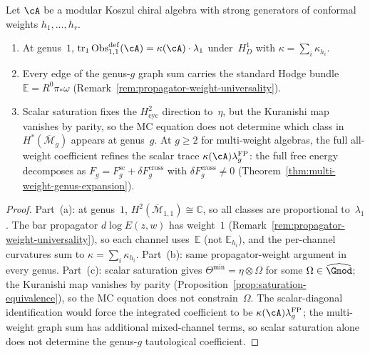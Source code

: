 \begin{proposition}
\label{prop:multi-generator-obstruction}
Let $\cA$ be a modular Koszul chiral algebra with strong generators
of conformal weights $h_1, \ldots, h_r$.
\begin{enumerate}[label=\textup{(\alph*)}]
\item At genus~$1$,
$\operatorname{tr}_1\operatorname{Obs}^{\mathrm{def}}_{1,1}(\cA) = \kappa(\cA) \cdot \lambda_1$
under~$H_D^1$
with $\kappa = \sum_i \kappa_{h_i}$.
\item Every edge of the genus-$g$ graph sum carries the standard
Hodge bundle $\mathbb{E} = R^0\pi_*\omega$
\textup{(}Remark~\textup{\ref{rem:propagator-weight-universality}}\textup{)}.
\item Scalar saturation fixes the $H^2_{\mathrm{cyc}}$ direction
to~$\eta$, but the Kuranishi map vanishes by parity, so the
MC equation does not determine which class in
$H^*(\overline{\mathcal{M}}_g)$ appears at genus~$g$.
 At $g \geq 2$ for multi-weight algebras, the full all-weight
 coefficient refines the scalar trace
 \(\kappa(\cA)\lambda_g^{\mathrm{FP}}\): the full free energy
 decomposes as \(F_g=F_g^{\mathrm{sc}}+\delta F_g^{\mathrm{cross}}\)
 with $\delta F_g^{\mathrm{cross}} \neq 0$
 (Theorem~\textup{\ref{thm:multi-weight-genus-expansion}}).
\end{enumerate}
\end{proposition}

\begin{proof}
Part~(a): at genus~$1$, $H^2(\overline{\mathcal{M}}_{1,1})
\cong \mathbb{C}$, so all classes are proportional
to~$\lambda_1$. The bar propagator $d\!\log E(z,w)$ has
weight~$1$ (Remark~\ref{rem:propagator-weight-universality}),
so each channel uses~$\mathbb{E}$ (not $\mathbb{E}_{h_i}$),
and the per-channel curvatures sum to
$\kappa = \sum_i \kappa_{h_i}$.
Part~(b): same propagator-weight argument in every genus.
Part~(c): scalar saturation gives
$\Theta^{\min} = \eta\otimes\Omega$ for some
$\Omega \in \widehat{\Gmod}$; the Kuranishi map vanishes by
parity (Proposition~\ref{prop:saturation-equivalence}), so the
MC equation does not constrain~$\Omega$. The scalar-diagonal
identification would force the integrated coefficient to be
$\kappa(\cA)\lambda_g^{\mathrm{FP}}$; the multi-weight graph sum has
additional mixed-channel terms, so scalar saturation alone does not
determine the genus-$g$ tautological coefficient.
\end{proof}

